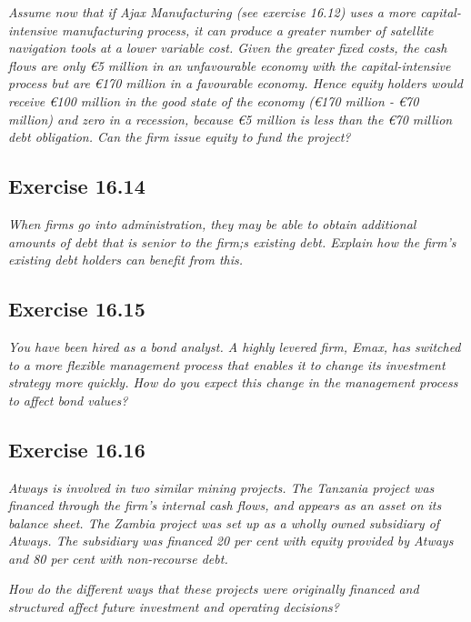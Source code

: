 \documentclass[]{book}
\newcommand{\euro}{€}
\theoremstyle{definition}
\theoremstyle{definition}
\theoremstyle{remark}
\begin{document}
\emph{Assume now that if Ajax Manufacturing (see exercise 16.12) uses a
more capital-intensive manufacturing process, it can produce a greater
number of satellite navigation tools at a lower variable cost. Given the
greater fixed costs, the cash flows are only \euro{}5 million in an
unfavourable economy with the capital-intensive process but are
\euro{}170 million in a favourable economy. Hence equity holders would
receive \euro{}100 million in the good state of the economy (\euro{}170
million - \euro{}70 million) and zero in a recession, because \euro{}5
million is less than the \euro{}70 million debt obligation. Can the firm
issue equity to fund the project?} \citep[p.552]{book}

\subsection{Exercise 16.14}\label{exercise-16.14}

\emph{When firms go into administration, they may be able to obtain
additional amounts of debt that is senior to the firm;s existing debt.
Explain how the firm's existing debt holders can benefit from this.}
\citep[p.552]{book}

\subsection{Exercise 16.15}\label{exercise-16.15}

\emph{You have been hired as a bond analyst. A highly levered firm,
Emax, has switched to a more flexible management process that enables it
to change its investment strategy more quickly. How do you expect this
change in the management process to affect bond values?}
\citep[p.552]{book}

\subsection{Exercise 16.16}\label{exercise-16.16}

\emph{Atways is involved in two similar mining projects. The Tanzania
project was financed through the firm's internal cash flows, and appears
as an asset on its balance sheet. The Zambia project was set up as a
wholly owned subsidiary of Atways. The subsidiary was financed 20 per
cent with equity provided by Atways and 80 per cent with non-recourse
debt.} \citep[p.552]{book}

\emph{How do the different ways that these projects were originally
financed and structured affect future investment and operating
decisions?} \citep[p.552]{book}
\end{document}
